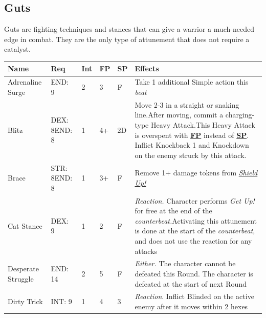 \documentclass[12pt]{article}
\newcommand{\refto}[1]{\hyperlink{#1}{\textbf{#1}}}
\newcommand{\reftoit}[1]{\hyperlink{#1}{\emph{#1}}}
\begin{document}
\subsection{Guts}
Guts are fighting techniques and stances that can give a warrior a much-needed edge in combat. They are the only type of attunement that does not require a catalyst.
\begin{center}
\begin{tabularx}{\textwidth}{p{}p{}p{}p{}p{}p{}}
\hline
\rowcolor{white} \textbf{Name} & \textbf{Req} & \textbf{Int} & \textbf{FP} & \textbf{SP} & \textbf{Effects}\setcounter{rownum}{0}\\
\hline
Adrenaline Surge & END: 9 & 2 & 3 & F & Take 1 additional Simple action this \emph{beat}\\
Blitz & DEX: 8\newline END: 8 & 1 & 4+ & 2D & Move 2-3 in a straight or snaking line.\newline After moving, commit a charging-type Heavy Attack.\newline This Heavy Attack is overspent with \refto{FP} instead of \refto{SP}. Inflict Knockback 1 and Knockdown on the enemy struck by this attack.\\
Brace & STR: 8\newline END: 8 & 1 & 3+ & F & Remove 1+ damage tokens from \reftoit{Shield Up!}\\
Cat Stance & DEX: 9 & 1 & 2 & F & \emph{Reaction.} Character performs \emph{Get Up!} for free at the end of the \emph{counterbeat.}\newline Activating this attunement is done at the start of the \emph{counterbeat}, and does not use the reaction for any attacks\\
Desperate Struggle & END: 14 & 2 & 5 & F & \emph{Either.} The character cannot be defeated this Round. The character is defeated at the start of next Round \\
Dirty Trick & INT: 9 & 1 & 4 & 3 & \emph{Reaction}. Inflict Blinded on the active enemy after it moves within 2 hexes \\
\hline
\end{tabularx}
\end{center}

\pagebreak
\end{document}

